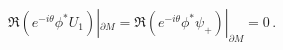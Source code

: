 \begin{equation}
\Re \left( e^{-i\theta}\phi^* U_1 \right)|_{\partial M}=
\Re \left( e^{-i\theta}\phi^* \psi_+ \right)|_{\partial M}=
0\,.\label{bcU1D}
\end{equation}

